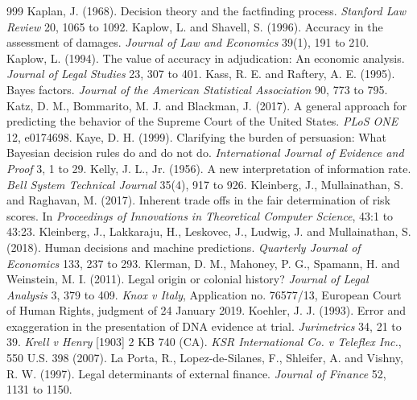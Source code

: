 \begin{thebibliography}{999}
 Kaplan, J. (1968). Decision theory and the factfinding process. \emph{Stanford Law Review} 20, 1065 to 1092.
 Kaplow, L. and Shavell, S. (1996). Accuracy in the assessment of damages. \emph{Journal of Law and Economics} 39(1), 191 to 210.
 Kaplow, L. (1994). The value of accuracy in adjudication: An economic analysis. \emph{Journal of Legal Studies} 23, 307 to 401.
 Kass, R. E. and Raftery, A. E. (1995). Bayes factors. \emph{Journal of the American Statistical Association} 90, 773 to 795.
 Katz, D. M., Bommarito, M. J. and Blackman, J. (2017). A general approach for predicting the behavior of the Supreme Court of the United States. \emph{PLoS ONE} 12, e0174698.
 Kaye, D. H. (1999). Clarifying the burden of persuasion: What Bayesian decision rules do and do not do. \emph{International Journal of Evidence and Proof} 3, 1 to 29.
 Kelly, J. L., Jr. (1956). A new interpretation of information rate. \emph{Bell System Technical Journal} 35(4), 917 to 926.
 Kleinberg, J., Mullainathan, S. and Raghavan, M. (2017). Inherent trade offs in the fair determination of risk scores. In \emph{Proceedings of Innovations in Theoretical Computer Science}, 43:1 to 43:23.
 Kleinberg, J., Lakkaraju, H., Leskovec, J., Ludwig, J. and Mullainathan, S. (2018). Human decisions and machine predictions. \emph{Quarterly Journal of Economics} 133, 237 to 293.
 Klerman, D. M., Mahoney, P. G., Spamann, H. and Weinstein, M. I. (2011). Legal origin or colonial history? \emph{Journal of Legal Analysis} 3, 379 to 409.
 \emph{Knox v Italy}, Application no. 76577/13, European Court of Human Rights, judgment of 24 January 2019.
 Koehler, J. J. (1993). Error and exaggeration in the presentation of DNA evidence at trial. \emph{Jurimetrics} 34, 21 to 39.
 \emph{Krell v Henry} [1903] 2 KB 740 (CA).
 \emph{KSR International Co. v Teleflex Inc.}, 550 U.S. 398 (2007).
 La Porta, R., Lopez-de-Silanes, F., Shleifer, A. and Vishny, R. W. (1997). Legal determinants of external finance. \emph{Journal of Finance} 52, 1131 to 1150.

\end{thebibliography}
